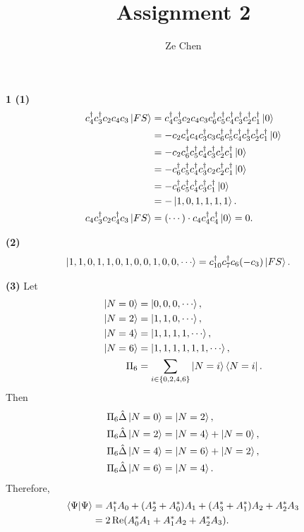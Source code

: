 \documentclass{article}
\title{Assignment 2}
\author{Ze Chen}
\makeatletter
\newcommand*{\shifttext}[1]{%
  \settowidth{\@tempdima}{#1}%
  \hspace{-\@tempdima}#1%
}
\newcommand{\plabel}[1]{%
\shifttext{\textbf{#1}\quad}%
}
\newcommand{\minusbaseline}{\abovedisplayskip=0pt\abovedisplayshortskip=0pt~\vspace*{-\baselineskip}}%
\makeatother
\begin{document}
\maketitle

\plabel{1 (1)}%
\begingroup\minusbaseline
\begin{align*}
    c^\dagger_4 c^\dagger_3 c_2 c_4 c_3 \ket{FS} &= c^\dagger_4 c^\dagger_3 c_2 c_4 c_3 c^\dagger_6 c^\dagger_5 c^\dagger_4 c^\dagger_3 c^\dagger_2 c^\dagger_1 \ket{0} \\
    &= -c_2 c^\dagger_4 c_4 c^\dagger_3 c_3 c^\dagger_6 c^\dagger_5 c^\dagger_4 c^\dagger_3 c^\dagger_2 c^\dagger_1 \ket{0} \\
    &= -c_2 c^\dagger_6 c^\dagger_5 c^\dagger_4 c^\dagger_3 c^\dagger_2 c^\dagger_1 \ket{0} \\
    &= -c^\dagger_6 c^\dagger_5 c^\dagger_4 c^\dagger_3 c_2 c^\dagger_2 c^\dagger_1 \ket{0} \\
    &= -c^\dagger_6 c^\dagger_5 c^\dagger_4 c^\dagger_3 c^\dagger_1 \ket{0} \\
    &= -\ket{1,0,1,1,1,1}. \\
    c_4 c^\dagger_3 c_2 c^\dagger_4 c_3 \ket{FS} &= (\cdots) \cdot c_4 c^\dagger_4 c^\dagger_4 \ket{0} = 0.
\end{align*}
\endgroup

\plabel{(2)}%
\begingroup\minusbaseline
\begin{align*}
    \ket{1,1,0,1,1,0,1,0,0,1,0,0,\cdots} &= c^\dagger_{10} c^\dagger_{7} c_6 (-c_3) \ket{FS}.
\end{align*}
\endgroup

\plabel{(3)}%
Let
\begin{align*}
    \ket{N=0} &= \ket{0,0,0,\cdots}, \\
    \ket{N=2} &= \ket{1,1,0,\cdots}, \\
    \ket{N=4} &= \ket{1,1,1,1,\cdots}, \\
    \ket{N=6} &= \ket{1,1,1,1,1,1,\cdots}, \\
    \Pi_6 &= \sum_{i\in\qty{0,2,4,6}} \ket{N=i}\bra{N=i}.
\end{align*}
Then
\begin{align*}
    \Pi_6 \hat{\Delta} \ket{N=0} &= \ket{N=2}, \\
    \Pi_6 \hat{\Delta} \ket{N=2} &= \ket{N=4} + \ket{N=0}, \\
    \Pi_6 \hat{\Delta} \ket{N=4} &= \ket{N=6} + \ket{N=2}, \\
    \Pi_6 \hat{\Delta} \ket{N=6} &= \ket{N=4}. \\
\end{align*}
Therefore,
\begin{align*}
    \bra{\Psi}\ket{\Psi} &= A_1^* A_0 + (A_2^* + A_0^*) A_1 + (A_3^* + A_1^*) A_2 + A^*_2 A_3 \\
    &= 2 \Re(A_0^* A_1 + A_1^* A_2 + A_2^* A_3).
\end{align*}
\end{document}
